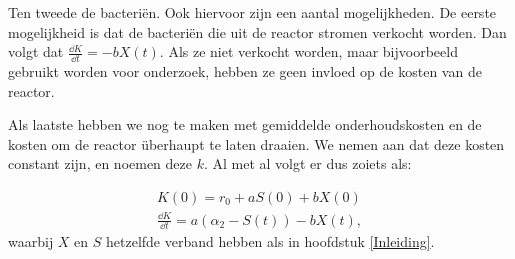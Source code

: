 Ten tweede de bacteri\"en. Ook hiervoor zijn een aantal mogelijkheden. De eerste mogelijkheid is dat de bacteri\"en die uit de reactor stromen verkocht worden. Dan volgt dat $\frac{\dd K}{\dd t} = -bX(t)$. Als ze niet verkocht worden, maar bijvoorbeeld gebruikt worden voor onderzoek, hebben ze geen invloed op de kosten van de reactor. 

Als laatste hebben we nog te maken met gemiddelde onderhoudskosten en de kosten om de reactor \"uberhaupt te laten draaien. We nemen aan dat deze kosten constant zijn, en noemen deze $k$. Al met al volgt er dus zoiets als:

\begin{align*}
	K(0) = r_0 + aS(0) + bX(0) \\
	\frac{\dd K}{\dd t} = a (\alpha_2 - S(t)) - bX(t),
\end{align*}
waarbij $X$ en $S$ hetzelfde verband hebben als in hoofdstuk \ref{Inleiding}.

